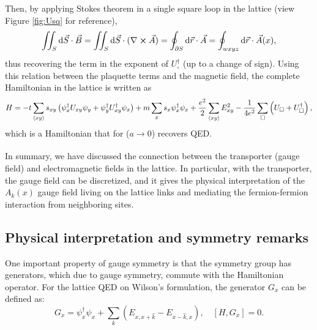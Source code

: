 \documentclass[a4paper]{report}
\begin{document}
\begin{spacing}{1.1}
Then, by applying Stokes theorem in a single square loop in the lattice (view Figure \ref{fig:Usq} for reference),
\begin{equation}
    \iint_S \dd \vec{S} \cdot \vec{B} = \iint_S \dd \vec{S} \cdot ( \nabla \cross \vec{A}) = \oint_{\partial S} \dd \vec{r} \cdot \vec{A} = \oint_{wxyz} \dd \vec{r} \cdot \vec{A}(x),
\end{equation}
thus recovering the term in the exponent of $U^\dagger_\square$ (up to a change of sign). Using this relation between the plaquette terms and the magnetic field, the complete Hamiltonian in the lattice is written as \cite{wiese2013ultracold}
\begin{equation}
    H = -t \sum_{\expval{xy}}s_{xy}\left( \psi^\dagger_x U_{xy} \psi_y + \psi^\dagger_y U^\dagger_{xy} \psi_x \right) + m \sum_x s_x \psi^\dagger_x \psi_x + \frac{e^2}{2} \sum_{\expval{xy}} E^2_{xy} - \frac{1}{4e^2} \sum_\square \left( U_\square + U^\dagger_\square \right), \label{eq:HamQED}
\end{equation}
which is a Hamiltonian that for ($a \xrightarrow[]{} 0$) recovers QED. 

In summary, we have discussed the connection between the transporter (gauge field) and electromagnetic fields in the lattice. In particular, with the transporter, the gauge field can be discretized, and it gives the physical interpretation of the $A_k(x)$ gauge field living on the lattice links and mediating the fermion-fermion interaction from neighboring sites.


\subsection{Physical interpretation and symmetry remarks}

One important property of gauge symmetry is that the symmetry group has generators, which due to gauge symmetry, commute with the Hamiltonian operator. For the lattice QED on Wilson's formulation, the generator $G_x$ can be defined as:
\begin{equation} \label{eq:Gx}
    G_x = \psi^\dagger_x \psi_x + \sum_k \left( E_{x,x+\hat{k}} - E_{x-\hat{k},x}  \right), \quad \left[ H,G_x \right] = 0.
\end{equation}


\end{spacing}
\end{document}
